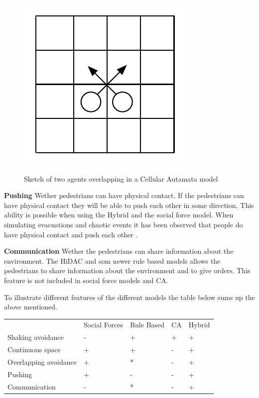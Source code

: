 \begin{figure}
    \centering
    {\includegraphics[scale=0.55]{Figures/Overlapping.pdf}} 
    \caption{Sketch of two agents overlapping in a Cellular Autamata model}
    \label{Overlapping}
\end{figure}

\textbf{Pushing} Wether pedestrians can have physical contact. If the pedestrians 
can have physical contact they will be able to push each other in some direction. 
This ability is possible when using the Hybrid and the social force model. When 
simulating evacuations and chaotic events it has been observed that people do have 
physical contact and push each other \cite{self-org}.

\textbf{Communication} Wether the pedestrians can share information about the 
environment. The HiDAC and som newer rule based models allows the pedestrians 
to share information about the environment and to give orders. This feature is 
not included in social force models and CA. \cite{Comparison}

To illustrate different features of the different models the table below sums 
up the above mentioned.

\begin{center}
\begin{tabular}{lllll}
 & Social Forces & Rule Based & CA & Hybrid\\
Shaking avoidance     & - & + & + & +\\
Continuous space      & + & + & - & +\\
Overlapping avoidance & + & * & - & +\\
Pushing               & + & - & - & +\\
Communication         & - & * & - & +
\end{tabular}
\end{center}

